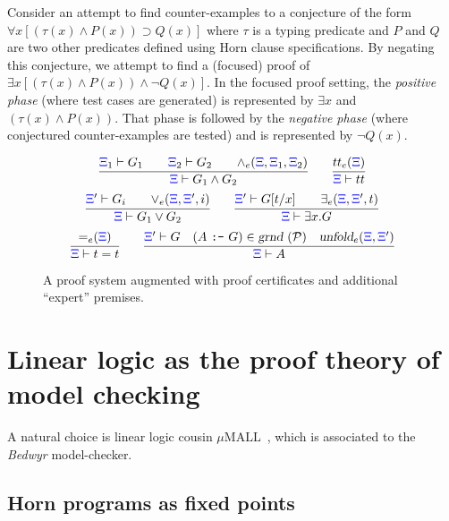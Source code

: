 \documentclass[a4paper]{easychair}
\newcommand{\instan}[1]{\hbox{\sl grnd}~(#1)}
\newcommand{\Pscr}{{\mathcal P}}
\newcommand{\true}{tt}
\newcommand{\trueExpert }[1]{{\true_e}(#1)}
\newcommand{\eqExpert }[1]{{=_e}(#1)}
\newcommand{\unfoldExpert}[2]{{\hbox{\sl unfold}_e}(#1,#2)}
\newcommand{\andExpert}[3]{{\wedge_e}(#1,#2,#3)}
\newcommand{\orExpert  }[3]{{\vee_e}(#1,#2,#3)}
\newcommand{\someExpert}[3]{\exists_e(#1,#2,#3)}
\begin{document}
Consider an attempt to find counter-examples to a conjecture of the
form \(\forall x [(\tau(x)\wedge P(x)) \supset Q(x)]\) where $\tau$ is
a typing predicate and $P$ and $Q$ are two other predicates defined
using Horn clause specifications.
%
By negating this conjecture, we attempt to find a (focused) proof of 
\(\exists x [(\tau(x)\land P(x)) \land \neg Q(x)]\).
%
In the focused proof setting, the \emph{positive phase} (where
test cases are generated) is represented by \(\exists x\) and
\((\tau(x)\land P(x))\). 
%
That phase is followed by the \emph{negative phase} (where conjectured
counter-examples are tested) and is represented by \(\neg Q(x)\).
%
%
%

\begin{figure}
\newcommand{\XXi}{{\color{blue}{\Xi}}}
\[
\infer{\XXi\vdash G_1\wedge G_2}
      {\XXi_1\vdash G_1\qquad \XXi_2\vdash G_2\qquad \andExpert{\XXi}{\XXi_1}{\XXi_2}}
\qquad
\infer{\XXi\vdash \true}
      {\trueExpert{\XXi}}
\]
\vskip -6pt
\[
\infer{\XXi\vdash G_1\vee G_2}
      {\XXi'\vdash G_i\qquad \orExpert{\XXi}{\XXi'}{i}}
\qquad
\infer{\XXi\vdash \exists x. G}
      {\XXi'\vdash G[t/x]\qquad \someExpert{\XXi}{\XXi'}{t}}
\]
\vskip -6pt
\[
\infer{\XXi\vdash t = t}
      {\eqExpert{\XXi}}
\qquad
\infer{\XXi\vdash A}
      {\XXi'\vdash G \quad (A~\hbox{\tt :-}~G)\in\instan\Pscr
                     \quad \unfoldExpert{\XXi}{\XXi'}}
\]
\caption{A proof system augmented with proof certificates and
  additional ``expert'' premises.}
\label{fig:augmented}
\end{figure}


\section{Linear logic as the proof theory of model checking}
\label{sec:ll}



A natural choice is linear logic cousin $\mu\mathrm{MALL}$~\cite{Baelde12}, which is associated to  the \emph{Bedwyr} model-checker. %

\subsection{Horn programs as fixed points}
\label{ssec:lpfixed}
\end{document}
